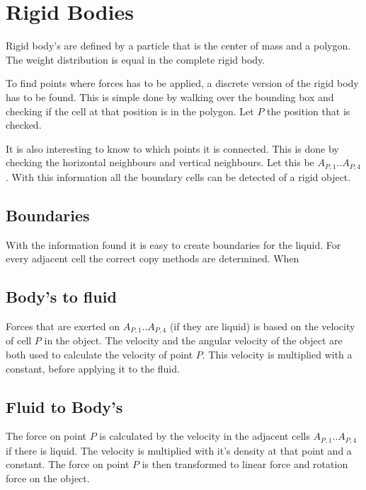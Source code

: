 \chapter{Rigid Bodies}
Rigid body's are defined by a particle that is the center of mass and a polygon. The weight distribution is equal in the complete rigid body.

To find points where forces has to be applied, a discrete version of the rigid body has to be found. This is simple done by walking over the bounding box and checking if the cell at that position is in the polygon. Let $P$ the position that is checked.

It is also interesting to know to which points it is connected. This is done by checking the horizontal neighbours and vertical neighbours. Let this be $A_{P,1} .. A_{P,4}$. With this information all the boundary cells can be detected of a rigid object.

\section{Boundaries}
With the information found it is easy to create boundaries for the liquid. For every adjacent cell the correct copy methods are determined. When 

\section{Body's to fluid}
Forces that are exerted on $A_{P,1} .. A_{P,4}$ (if they are liquid) is based on the velocity of cell $P$ in the object. The velocity  and the angular velocity of the object are both used to calculate the velocity of point $P$. This velocity is multiplied with a constant, before applying it to the fluid.

\section{Fluid to Body's}
The force on point $P$ is calculated by the velocity in the adjacent cells $A_{P,1} .. A_{P,4}$ if there is liquid. The velocity is multiplied with it's density at that point and a constant. The force on point $P$ is then transformed to linear force and rotation force on the object. 